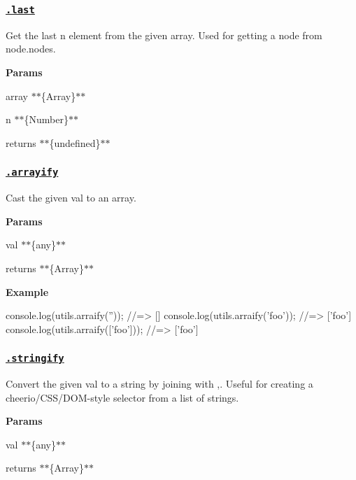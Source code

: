 \subsubsection*{\href{index.js#L915}{\tt .last}}

Get the last {\ttfamily n} element from the given {\ttfamily array}. Used for getting a node from {\ttfamily node.\+nodes.}

{\bfseries Params}


\begin{DoxyItemize}
\item {\ttfamily array} $\ast$$\ast$\{Array\}$\ast$$\ast$
\item {\ttfamily n} $\ast$$\ast$\{Number\}$\ast$$\ast$
\item {\ttfamily returns} $\ast$$\ast$\{undefined\}$\ast$$\ast$
\end{DoxyItemize}

\subsubsection*{\href{index.js#L935}{\tt .arrayify}}

Cast the given {\ttfamily val} to an array.

{\bfseries Params}


\begin{DoxyItemize}
\item {\ttfamily val} $\ast$$\ast$\{any\}$\ast$$\ast$
\item {\ttfamily returns} $\ast$$\ast$\{Array\}$\ast$$\ast$
\end{DoxyItemize}

{\bfseries Example}


\begin{DoxyCode}
console.log(utils.arraify(''));
//=> []
console.log(utils.arraify('foo'));
//=> ['foo']
console.log(utils.arraify(['foo']));
//=> ['foo']
\end{DoxyCode}


\subsubsection*{\href{index.js#L948}{\tt .stringify}}

Convert the given {\ttfamily val} to a string by joining with {\ttfamily ,}. Useful for creating a cheerio/\+C\+S\+S/\+D\+O\+M-\/style selector from a list of strings.

{\bfseries Params}


\begin{DoxyItemize}
\item {\ttfamily val} $\ast$$\ast$\{any\}$\ast$$\ast$
\item {\ttfamily returns} $\ast$$\ast$\{Array\}$\ast$$\ast$
\end{DoxyItemize}

